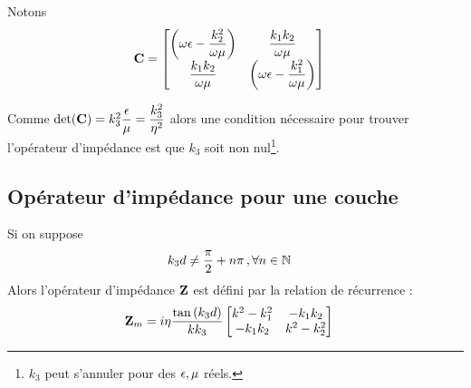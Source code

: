 Notons
\begin{align}
    \mC &=
    \begin{bmatrix}
        \left(\w\eps-\frac{k_2^2}{\w\mu}\right) & \frac{k_1k_2}{\w\mu}\\
        \frac{k_1k_2}{\w\mu} & \left(\w\eps-\frac{k_1^2}{\w\mu}\right)
    \end{bmatrix}
\end{align}

Comme $\det(\mC) = k_3^2\frac{\eps}{\mu}=\frac{k_3^2}{\eta^2}$ alors une condition nécessaire pour trouver l'opérateur d'impédance est que $k_3$ soit non nul\footnote{$k_3$ peut s'annuler pour des $\eps,\mu$ réels.}.


\subsection{Opérateur d'impédance pour une couche}

\renewcommand{\x}{e_1}
\renewcommand{\y}{e_2}
\renewcommand{\z}{e_3}
\renewcommand{\peps}{\eps}
\renewcommand{\pmu}{{\mu}}
\begin{figure}[h!]
\centering
\begin{tikzpicture}

\end{tikzpicture}
\end{figure}

\begin{thm}
    Si on suppose
        \begin{align}
        k_3d &\not = \frac{\pi}{2}+n\pi\,, \forall n \in \NN
    \end{align}
    Alors l'opérateur d'impédance $\mZ$ est défini par la relation de récurrence : 
    \begin{align}
    \mZ_m &= i\eta\frac{\tan\left(k_3d\right)}{kk_3}
        \begin{bmatrix}
           k^2-k_1^2  & -k_1k_2\\
            -k_1k_2 & k^2-k_2^2\\
        \end{bmatrix}
    \end{align}
\end{thm}

